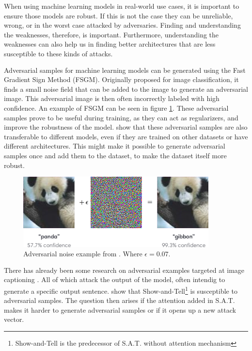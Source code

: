 When using machine learning models in real-world use cases, it is important to ensure those models are robust. If this is not the case they can be unreliable, wrong, or in the worst case attacked by adversaries. Finding and understanding the weaknesses, therefore, is important. Furthermore, understanding the weaknesses can also help us in finding better architectures that are less susceptible to these kinds of attacks.

Adversarial samples for machine learning models can be generated using the Fast Gradient Sign Method (FSGM)\cite{goodfellow2015explaining}. Originally proposed for image classification, it finds a small noise field that can be added to the image to generate an adversarial image. This adversarial image is then often incorrectly labeled with high confidence. An example of FSGM can be seen in figure \ref{adv_gibbon}. These adversarial samples prove to be useful during training, as they can act as regularizers, and improve the robustness of the model. \citeauthor{https://doi.org/10.48550/arxiv.1611.01236} show that these adversarial samples are also transferable to different models, even if they are trained on other datasets or have different architectures. This might make it possible to generate adversarial samples once and add them to the dataset, to make the dataset itself more robust.

\begin{figure}[h]
    \centering
    \includegraphics[width=0.9\textwidth]{figures/adversarial_img_1.png}
    \caption{Adversarial noise example from \protect\cite{goodfellow2015explaining}. Where $\epsilon=0.07$.}
    \label{adv_gibbon}
\end{figure}

There has already been some research on adversarial examples targeted at image captioning \cite{https://doi.org/10.48550/arxiv.2107.03050,Hongge}. All of which attack the output of the model, often intendig to generate a specific output sentence. \citeauthor{Hongge} show that Show-and-Tell\footnote[1]{Show-and-Tell is the predecessor of S.A.T. without attention mechanism}\cite{showandtell} is susceptible to adversarial samples. The question then arises if the attention added in S.A.T. makes it harder to generate adversarial samples or if it opens up a new attack vector.


